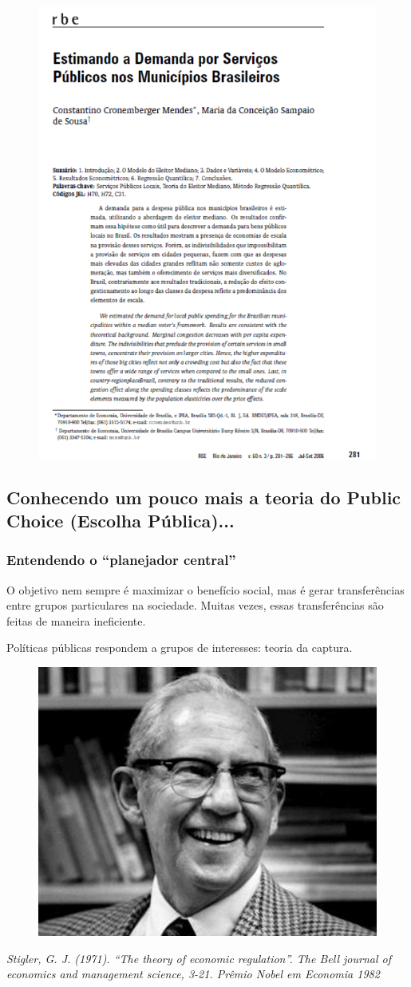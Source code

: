 \documentclass[a4paper,12pt]{article}[abntex2]
\begin{document}
\begin{figure}[H]
    \centering
    \includegraphics[width=0.7\linewidth]{Imagens/a15i3.png}
\end{figure}

\subsection{\textbf{Conhecendo um pouco mais a teoria do Public Choice (Escolha Pública)...}}
\subsubsection{\textbf{Entendendo o “planejador central”}}
O objetivo nem sempre é maximizar o benefício social, mas é gerar transferências entre grupos particulares na sociedade. Muitas vezes, essas transferências são feitas de maneira ineficiente. 

Políticas públicas respondem a grupos de interesses: teoria da captura.

\begin{figure}[H]
    \centering
    \includegraphics[width=0.7\linewidth]{Imagens/a15i4.png}
\end{figure}
\textit{Stigler, G. J. (1971). “The theory of economic regulation”. The Bell journal of economics and management science, 3-21. Prêmio Nobel em Economia 1982}
\end{document}
